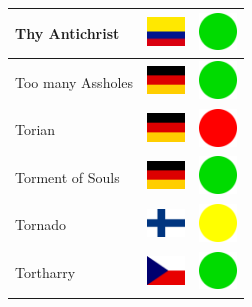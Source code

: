 \documentclass[12pt, a4paper, twoside]{report}
\begin{document}
\begin{center}
\begin{longtable}{|p{5cm}|p{2cm}|p{2cm}|}
Thy Antichrist & \includegraphics[width=1cm]{4x3/co} & \includegraphics[width=1cm]{likes/y} \\ \hline
Too many Assholes & \includegraphics[width=1cm]{4x3/de} & \includegraphics[width=1cm]{likes/y} \\ \hline
Torian & \includegraphics[width=1cm]{4x3/de} & \includegraphics[width=1cm]{likes/n} \\ \hline
Torment of Souls & \includegraphics[width=1cm]{4x3/de} & \includegraphics[width=1cm]{likes/y} \\ \hline
Tornado & \includegraphics[width=1cm]{4x3/fi} & \includegraphics[width=1cm]{likes/m} \\ \hline
Tortharry & \includegraphics[width=1cm]{4x3/cz} & \includegraphics[width=1cm]{likes/y} \\ \hline

\end{longtable}
\end{center}
\end{document}
